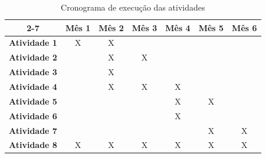 \begin{table}[h]
\centering
\caption{Cronograma de execução das atividades}
\label{tab-cronograma}
\begin{tabular}{c|c|c|c|c|c|c|}
\cline{2-7}
\multicolumn{1}{l|}{} & \textbf{Mês 1} & \textbf{Mês 2} & \textbf{Mês 3} & \textbf{Mês 4} & \textbf{Mês 5} & \textbf{Mês 6} \\ \hline
\multicolumn{1}{|c|}{\textbf{Atividade 1}} & X & X &  &  &  &  \\ \hline
\multicolumn{1}{|c|}{\textbf{Atividade 2}} &  & X & X &  &  &  \\ \hline
\multicolumn{1}{|c|}{\textbf{Atividade 3}} &  & X &  &  &  &  \\ \hline
\multicolumn{1}{|c|}{\textbf{Atividade 4}} &  & X & X & X &  &  \\ \hline
\multicolumn{1}{|c|}{\textbf{Atividade 5}} &  &  &  & X & X &  \\ \hline
\multicolumn{1}{|c|}{\textbf{Atividade 6}} &  &  &  & X & &  \\ \hline
\multicolumn{1}{|c|}{\textbf{Atividade 7}} &  &  &  &  & X & X \\ \hline
\multicolumn{1}{|c|}{\textbf{Atividade 8}} & X & X & X & X & X & X \\ \hline
\end{tabular}
\end{table}